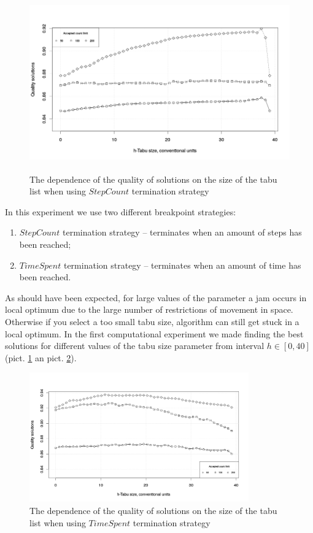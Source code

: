 \documentclass[]{TAACpaper}
\begin{document}
\begin{figure}[h]
	\hfil\includegraphics[height=3.0in]{images/tabuSize_stepCount}\hfil
	\caption
	{
	  The dependence of the quality of solutions on the size of the tabu list when using $ StepCount $ termination strategy
	}
	\label{aba:fig2}
\end{figure}

In this experiment we use two different breakpoint strategies: 
\begin{enumerate}
	\item $StepCount$ termination strategy --  terminates when an amount of steps has been reached;
	\item $TimeSpent$ termination strategy -- terminates when an amount of time has been reached.
\end{enumerate}

As should have been expected, for large values of the parameter a jam occurs in local optimum due to the large number of restrictions of movement in space. Otherwise if you select a too small tabu size, algorithm can still get stuck in a local optimum. In the first computational experiment we made finding the best solutions for different values of the tabu size parameter from interval $h \in [0, 40]$ (pict. \ref{aba:fig2} an pict. \ref{aba:fig3}).
\begin{figure}[h]
	\hfil\includegraphics[height=2.2in]{images/tabuSize_time}\hfil
	\caption{
	  The dependence of the quality of solutions on the size of the tabu list when using $ TimeSpent $ termination strategy
	}
	\label{aba:fig3}
\end{figure}
\end{document}
